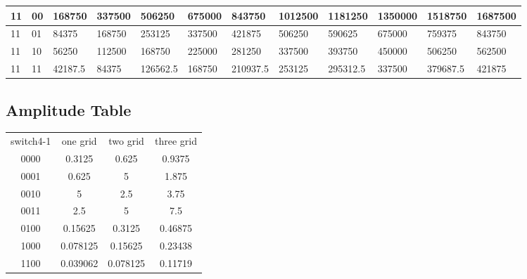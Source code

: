 \documentclass[11pt]{scrartcl}
\begin{document}
\begin{minipage}{.5\linewidth}
\begin{tabular}{p{0.3cm}|p{0.3cm}| p{1.2cm}|p{1.2cm}|p{1.2cm}|p{1.2cm}|p{1.2cm}|p{1.2cm}|p{1.2cm}|p{1.2cm}|p{1.2cm}|p{1.2cm}}
11&00&168750&337500&506250&675000&843750&1012500&1181250&1350000&1518750&1687500\\ \hline




11&01&84375&168750&253125&337500&421875&506250&590625&675000&759375&843750\\ \hline




11&10&56250&112500&168750&225000&281250&337500&393750&450000&506250&562500\\ \hline


11&11&42187.5&84375&126562.5&168750&210937.5&253125&295312.5&337500&379687.5&421875\\ 
\end{tabular}
\end{minipage}

\subsection{Amplitude Table}
\label{sec:amp}
\begin{center}
\begin{tabular}{cccc}
switch4-1& one grid & two grid & three grid\\
0000&0.3125&0.625&0.9375\\ \hline




0001&0.625&5&1.875\\ \hline




0010&5&2.5&3.75\\ \hline




0011&2.5&5&7.5\\ \hline




0100&0.15625&0.3125&0.46875\\ \hline




1000&0.078125&0.15625&0.23438\\ \hline




1100&0.039062&0.078125&0.11719\\ \hline
\end{tabular}
\end{center}
\end{document}
